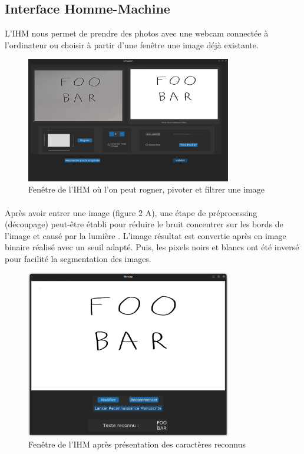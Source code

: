 \documentclass[a4paper]{article}
\begin{document}
		\subsection{Interface Homme-Machine}
			L'IHM nous permet de prendre des photos avec une webcam connectée à l'ordinateur ou choisir à partir d'une fenêtre une image déjà existante. 
			\begin{figure}[H]
				\centering
				\includegraphics[width=0.8\textwidth]{modif.png}
				\caption{Fenêtre de l'IHM où l'on peut rogner, pivoter et filtrer une image}
				\label{fig:modif}
			\end{figure}
			\paragraph{}
				Après avoir entrer une image (figure 2 A), une étape de préprocessing (découpage) peut-être établi pour réduire le bruit concentrer sur les bords de l'image et causé par la lumière .
				L'image résultat est convertie après en image binaire réalisé avec un seuil adapté. Puis, les pixels noirs et blancs ont été inversé pour facilité la segmentation des images.
			\begin{figure}[H]
				\centering
				\includegraphics[width=0.8\textwidth]{recon.png}
				\caption{Fenêtre de l'IHM après présentation des caractères reconnus}
				\label{fig:recon}
			\end{figure}
\end{document}
